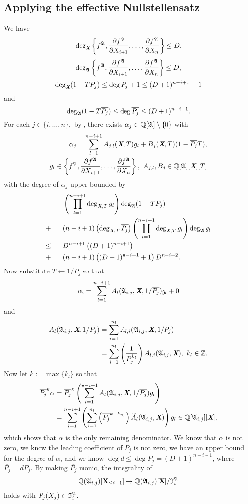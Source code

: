 \documentclass[sigconf]{acmart}
\def\Xb{\textit{\textbf{X}}}
\def\pjb{\overline{P_{j}}}
\def\Q{\mathbb{Q}}
\def\At{\widetilde{A}}
\def\I{\frak{I}}
\def\A{\frak{A}}
\begin{document}
\subsection{Applying the effective Nullstellensatz}
We have
\[
\deg_{\Xb}\left\{ 
f^\A,\frac{\partial f^\A}{\partial X_{i+1}},\hdots,\frac{\partial f^\A}{\partial X_n}
\right\}\leq D,
\]
\[
\deg_{\A}  
\left\{ 
f^\A,\frac{\partial f^\A}{\partial X_{i+1}},\hdots,\frac{\partial f^\A}{\partial X_n}
\right\} \leq D,
\]
\[
\deg_{\Xb}(1-T\pjb) \leq \deg \pjb +1 \leq (D+1)^{n-i+1}+1
\]
and
\[
\deg_{\A}(1-T\pjb) \leq \deg \pjb\leq (D+1)^{n-i+1}.
\]
For each $j \in \{i,\hdots,n\},$ by \cite[Theorem 0.5]{EN}, there exists $\alpha_j \in \mathbb{Q}[\A]\setminus\{0\}$ with 
\begin{align*}
\alpha_j = \sum_{l=1}^{n-i+1} A_{j,l}(\textit{\textbf{X}},T)g_l + B_j(\textit{\textbf{X}},T)(1-\pjb T), \\ g_l \in 
\left\{ 
f^\A,\frac{\partial f^\A}{\partial X_{i+1}},\hdots,\frac{\partial f^\A}{\partial X_n}
\right\},~ A_{j,l},B_j \in \mathbb{Q}[\A][\Xb][T]
\end{align*}
with the degree of $\alpha_j$ upper bounded by
\begin{align*}
    &\left(\prod_{l=1}^{n-i+1} \deg_{\Xb,T} g_l\right)\deg_{\A} (1-T\pjb)\\ 
    + ~~~~~&(n-i+1)\left(\deg_{\Xb,T}\pjb\right)\left(\prod_{l=1}^{n-i+1}\deg_{\Xb,T} g_l \right)\deg_{\A} g_l\\
    \leq ~~~~~&D^{n-i+1}\left( (D+1)^{n-i+1}\right)\\
    +~~~~~&(n-i+1)\left( (D+1)^{n-i+1}+1\right)D^{n-i+2}.
\end{align*}
Now substitute $T \leftarrow 1/\pjb$ so that 
\[
\alpha_i = \sum_{l=1}^{n-i+1} A_l(\A_{i,j},\textit{\textbf{X}},1/\pjb)g_l + 0
\]
and 
\begin{align*}
A_l(\A_{i,j},\textit{\textbf{X}},1/\pjb) &= \sum_{i=1}^{n_l} A_{l,i}(\A_{i,j},\Xb,1/\pjb)\\
&= \sum_{i=1}^{n_l} \left(\frac{1}{P_j^{k_l}}\right)\At_{l,i}(\A_{i,j},\textit{\textbf{X}}), ~k_l \in \mathbb{Z}.
\end{align*}
Now let $k := \max\{k_l\}$ so that 
\begin{align*}
    \pjb^k \alpha &= \pjb^k\left(\sum_{l=1}^{n-i+1} A_l(\A_{i,j},\textit{\textbf{X}},1/\pjb)g_l\right)\\
    &= \sum_{l=1}^{n-i+1}\left( \sum_{i=1}^{n_l}\left(\pjb^{k-k_{n_l}}\right)\At_l(\A_{i,j},\Xb) \right)g_l \in \Q[\A_{i,j}][\Xb],
\end{align*}
which shows that $\alpha$ is the only remaining denominator. We know that $\alpha$ is not zero, we know the leading coefficient of $\overline{P_j}$ is not zero, we have an upper bound for the degree of $\alpha$, and we know $\deg d \leq \deg P_j = (D+1)^{n-i+1}$, where $\pjb=dP_j.$ By making $\pjb$ monic, the integrality of 
\begin{align*}\mathbb{Q}(\frak{A}_{i,j})[\textbf{X}_{\leq i-1}]\rightarrow\mathbb{Q}(\frak{A}_{i,j})[\textbf{X}]/\I_i^{\A}
\end{align*}
holds with $\pjb(X_j)\in \I_i^{\A}.$
%
\end{document}
